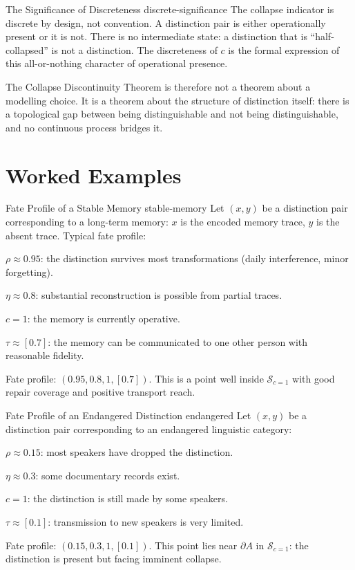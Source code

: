 \documentclass[12pt,twoside,openright]{book}
\newcommand{\fateSpace}{\mathcal{S}}
\newcommand{\survRatio}{\rho}             %
\newcommand{\repEff}{\eta}               %
\newcommand{\collapseInd}{c}             %
\newcommand{\admRegion}{A}
\newcommand{\fateComp}[1]{\fateSpace_{\collapseInd=#1}}
\providecommand{\fateComp}[1]{\fateSpace_{\collapseInd=#1}}
\providecommand{\admRegion}{A}
\begin{document}
\begin{remark}{The Significance of Discreteness}%
  {discrete-significance}
The collapse indicator is discrete by design, not convention.
A distinction pair is either operationally present or it is
not. There is no intermediate state: a distinction that is
``half-collapsed'' is not a distinction. The discreteness of
$\collapseInd$ is the formal expression of this all-or-nothing
character of operational presence.

The Collapse Discontinuity Theorem is therefore not a theorem
about a modelling choice. It is a theorem about the structure
of distinction itself: there is a topological gap between
being distinguishable and not being distinguishable, and no
continuous process bridges it.
\end{remark}

\section{Worked Examples}

\begin{example}{Fate Profile of a Stable Memory}%
  {stable-memory}
Let $(x,y)$ be a distinction pair corresponding to a long-term
memory: $x$ is the encoded memory trace, $y$ is the absent
trace. Typical fate profile:

$\survRatio\approx 0.95$: the distinction survives most
transformations (daily interference, minor forgetting).

$\repEff\approx 0.8$: substantial reconstruction is possible
from partial traces.

$\collapseInd=1$: the memory is currently operative.

$\tau\approx[0.7]$: the memory can be communicated to one
other person with reasonable fidelity.

Fate profile: $(0.95, 0.8, 1, [0.7])$.
This is a point well inside $\fateComp{1}$ with good
repair coverage and positive transport reach.
\end{example}

\begin{example}{Fate Profile of an Endangered Distinction}%
  {endangered}
Let $(x,y)$ be a distinction pair corresponding to an
endangered linguistic category:

$\survRatio\approx 0.15$: most speakers have dropped the
distinction.

$\repEff\approx 0.3$: some documentary records exist.

$\collapseInd=1$: the distinction is still made by some speakers.

$\tau\approx[0.1]$: transmission to new speakers is very limited.

Fate profile: $(0.15, 0.3, 1, [0.1])$.
This point lies near $\partial\admRegion$ in $\fateComp{1}$:
the distinction is present but facing imminent collapse.
\end{example}
\end{document}
